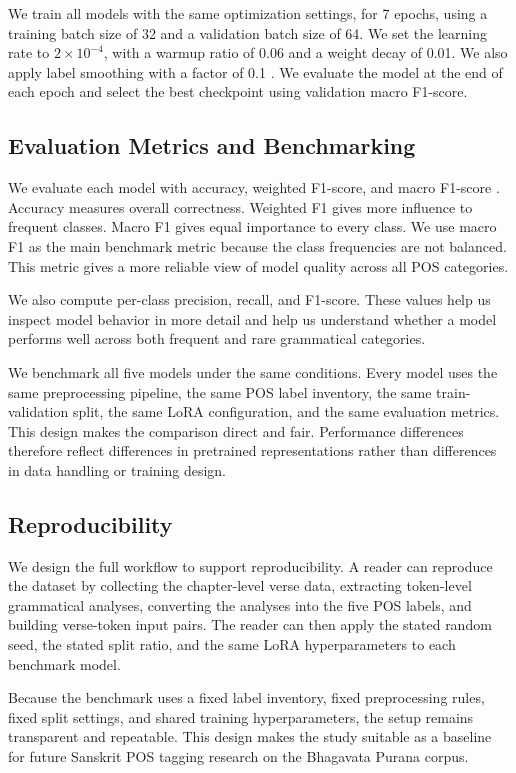 \documentclass[conference]{IEEEtran}
\begin{document}
We train all models with the same optimization settings, for 7 epochs, using a training batch size of 32 and a validation batch size of 64. We set the learning rate to $2 \times 10^{-4}$, with a warmup ratio of 0.06 and a weight decay of 0.01. We also apply label smoothing with a factor of 0.1 \cite{szegedy2016labelsmoothing}. We evaluate the model at the end of each epoch and select the best checkpoint using validation macro F1-score.

\subsection{Evaluation Metrics and Benchmarking}
We evaluate each model with accuracy, weighted F1-score, and macro F1-score \cite{pedregosa2011sklearn}. Accuracy measures overall correctness. Weighted F1 gives more influence to frequent classes. Macro F1 gives equal importance to every class. We use macro F1 as the main benchmark metric because the class frequencies are not balanced. This metric gives a more reliable view of model quality across all POS categories.

We also compute per-class precision, recall, and F1-score. These values help us inspect model behavior in more detail and help us understand whether a model performs well across both frequent and rare grammatical categories.

We benchmark all five models under the same conditions. Every model uses the same preprocessing pipeline, the same POS label inventory, the same train-validation split, the same LoRA configuration, and the same evaluation metrics. This design makes the comparison direct and fair. Performance differences therefore reflect differences in pretrained representations rather than differences in data handling or training design.

\subsection{Reproducibility}
We design the full workflow to support reproducibility. A reader can reproduce the dataset by collecting the chapter-level verse data, extracting token-level grammatical analyses, converting the analyses into the five POS labels, and building verse-token input pairs. The reader can then apply the stated random seed, the stated split ratio, and the same LoRA hyperparameters to each benchmark model.

Because the benchmark uses a fixed label inventory, fixed preprocessing rules, fixed split settings, and shared training hyperparameters, the setup remains transparent and repeatable. This design makes the study suitable as a baseline for future Sanskrit POS tagging research on the Bhagavata Purana corpus.
\end{document}
